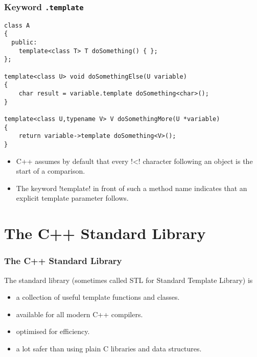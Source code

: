 
\begin{frame}[fragile]
\frametitle{Keyword \texttt{.template}}
\begin{lstlisting}
class A
{
  public:
    template<class T> T doSomething() { };
};

template<class U> void doSomethingElse(U variable)
{
    char result = variable.template doSomething<char>();
}

template<class U,typename V> V doSomethingMore(U *variable)
{
    return variable->template doSomething<V>();
}
\end{lstlisting}
\begin{itemize}%
\item C++ assumes by default that every \inline!<! character following an object is the start of a comparison.
\item The keyword \inline!template! in front of such a method name indicates that
an explicit template parameter follows.
\end{itemize}

\end{frame}



\section{The C++ Standard Library}


\begin{frame}
\frametitle<presentation>{The C++ Standard Library}
The standard library (sometimes called STL for Standard Template Library) is
\begin{itemize}%
\item a collection of useful template functions and classes.
\item available for all modern C++ compilers.
\item optimised for efficiency.
\item a lot safer than using plain C libraries and data structures.
\end{itemize}
\end{frame}


